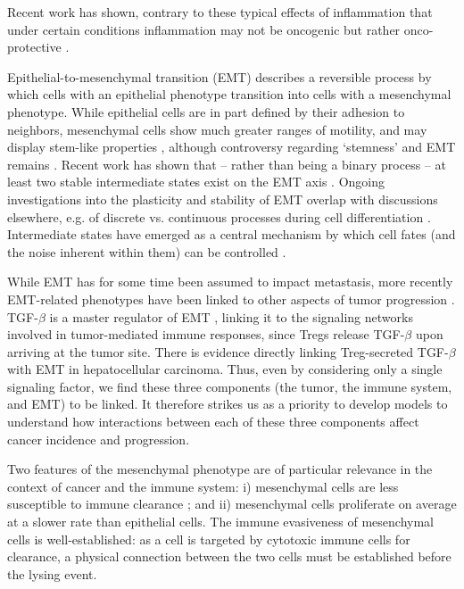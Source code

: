\documentclass[11pt]{article}
\begin{document}
Recent work has shown, contrary to these typical effects of inflammation that under certain conditions inflammation may not be oncogenic but rather onco-protective \cite{guo17_multiscale}.
\par
Epithelial-to-mesenchymal transition (EMT) describes a reversible process by which cells with an epithelial phenotype transition into cells with a mesenchymal phenotype.
While epithelial cells are in part defined by their adhesion to neighbors, mesenchymal cells show much greater ranges of motility, and may display stem-like properties \cite{nieto2016emt}, although controversy regarding `stemness' and EMT remains \cite{nie18_stem, sha19_intermediate}.  
Recent work has shown that -- rather than being a binary process -- at least two stable intermediate states exist on the EMT axis \cite{hong2015ovol2, jolly15_coupling}.
Ongoing investigations into the plasticity and stability of EMT overlap with discussions elsewhere, e.g. of discrete vs. continuous processes during cell differentiation \cite{moris16_transition}.
Intermediate states have emerged as a central mechanism by which cell fates (and the noise inherent within them) can be controlled \cite{maclean18_exploring, ta16_controlling, rackauckas18_meanindependent}. 
\par 
While EMT has for some time been assumed to impact metastasis, more recently EMT-related phenotypes have been linked to other aspects of tumor progression \cite{nieto2016emt,peinado2007snail}.
TGF-$\beta$ is a master regulator of EMT \cite{lim2012epithelial}, linking it to the signaling networks involved in tumor-mediated immune responses, since Tregs release TGF-$\beta$ upon arriving at the tumor site\cite{terry2017new}. 
There is evidence directly linking Treg-secreted TGF-$\beta$ with EMT in hepatocellular carcinoma\cite{shi2019cd4+}.
Thus, even by considering only a single signaling factor, we find these three components (the tumor, the immune system, and EMT) to be linked. It therefore strikes us as a priority to develop models to understand how interactions between each of these three components affect cancer incidence and progression.
\par
Two features of the mesenchymal phenotype are of particular relevance in the context of cancer and the immune system: i) mesenchymal cells are less susceptible to immune clearance \cite{terry2017new}; and ii) mesenchymal cells proliferate on average at a slower rate than epithelial cells.
The immune evasiveness of mesenchymal cells is well-established: as a cell is targeted by cytotoxic immune cells for clearance, a physical connection between the two cells must be established before the lysing event.
\end{document}
